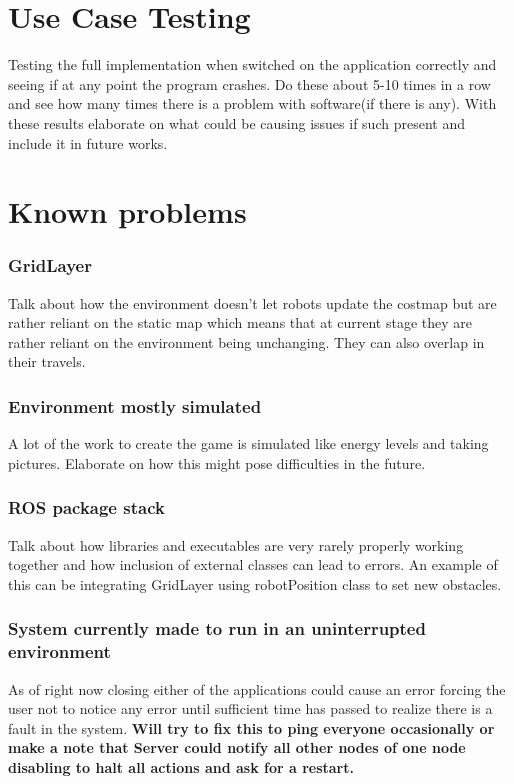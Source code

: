 \documentclass{report}
\begin{document}
    \section{Use Case Testing}
      Testing the full implementation when switched on the application correctly and seeing if at any point the program crashes. Do these about 5-10 times in a row and see how many times there is a problem with software(if there is any). With these results elaborate on what could be causing issues if such present and include it in future works.
    \section{Known problems}
      \subsubsection{GridLayer}
        Talk about how the environment doesn't let robots update the costmap but are rather reliant on the static map which means that at current stage they are rather reliant on the environment being unchanging. They can also overlap in their travels.
      \subsubsection{Environment mostly simulated}
        A lot of the work to create the game is simulated like energy levels and taking pictures. Elaborate on how this might pose difficulties in the future.
      \subsubsection{ROS package stack}
        Talk about how libraries and executables are very rarely properly working together and how inclusion of external classes can lead to errors. An example of this can be integrating GridLayer using robotPosition class to set new obstacles.
      \subsubsection{System currently made to run in an uninterrupted environment}
        As of right now closing either of the applications could cause an error forcing the user not to notice any error until sufficient time has passed to realize there is a fault in the system. \textbf{Will try to fix this to ping everyone occasionally or make a note that Server could notify all other nodes of one node disabling to halt all actions and ask for a restart.}
\end{document}
